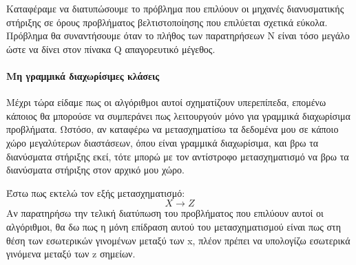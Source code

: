 		Καταφέραμε να διατυπώσουμε το πρόβλημα που επιλύουν οι μηχανές διανυσματικής στήριξης σε όρους προβλήματος βελτιστοποίησης που επιλύεται σχετικά εύκολα. Πρόβλημα θα συναντήσουμε όταν το πλήθος των παρατηρήσεων Ν είναι τόσο μεγάλο ώστε να δίνει στον πίνακα Q απαγορευτικό μέγεθος.
		
		
		\paragraph{Μη γραμμικά διαχωρίσιμες κλάσεις}
		Μέχρι τώρα είδαμε πως οι αλγόριθμοι αυτοί σχηματίζουν υπερεπίπεδα, επομένω κάποιος θα μπορούσε να συμπεράνει πως λειτουργούν μόνο για γραμμικά διαχωρίσιμα προβλήματα. Ωστόσο, αν καταφέρω να μετασχηματίσω τα δεδομένα μου σε κάποιο χώρο μεγαλύτερων διαστάσεων, όπου είναι γραμμικά διαχωρίσιμα, και βρω τα διανύσματα στήριξης εκεί, τότε μπορώ με τον αντίστροφο μετασχηματισμό να βρω τα διανύσματα στήριξης στον αρχικό μου χώρο.
		
		Έστω πως εκτελώ τον εξής μετασχηματισμό:
	   \begin{equation}
	   		X \rightarrow Z
	   \end{equation}
		Αν παρατηρήσω την τελική διατύπωση του προβλήματος που επιλύουν αυτοί οι αλγόριθμοι, θα δω πως η μόνη επίδραση αυτού του μετασχηματισμού είναι πως στη θέση των εσωτερικών γινομένων μεταξύ των x, πλέον πρέπει να υπολογίζω εσωτερικά γινόμενα μεταξύ των z σημείων.
		
